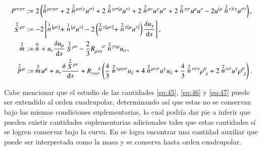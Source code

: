 \begin{align}
I^{\mu \nu \gamma \sigma} &:= 2\left( \des{2}{n}^{\mu \nu \gamma \sigma} + 2 \des{2}{n}^{\mu \nu (\gamma} u^{\sigma)} + 2\des{2}{n}^{\gamma \sigma (\mu} u^{\nu)} + 2\des{2}{n}^{\mu \nu} u^{\gamma} u^{\sigma} + 2\des{2}{n}^{\gamma \sigma} u^{\mu} u^{\nu} - 2 u^{(\mu} \des{2}{n}^{\nu)(\gamma} u^{\sigma)} \right),\\
\des{2}{S}^{\mu \nu} &:= -2 \left[ \des{1}{n}^{[\mu \nu]} + \des{1}{n}^{[\mu} u^{\nu]} - 2\left( \des{2}{n}^{\gamma [\mu \nu]} + \des{2}{n}^{\gamma [\mu} u^{\nu]} \right) \cd{u_{\gamma}} \right],\\
\des{2}{m} &:= \ \des{0}{n} + u_{\nu} \cd{u_{\mu}} \des{2}{S}^{\mu \nu} - \frac{2}{3} R_{\mu \nu \gamma}^{\ \ \ \ \sigma} \des{2}{n}^{\gamma \nu \mu} u_{\sigma},\\
\des{2}{p}^{\mu} &:= \ \des{2}{m} u^{\mu} + u_{\nu} \cd{\des{2}{S}^{\mu \nu}} + R_{\nu \gamma \sigma}^{\ \ \ \ \delta} \left( \frac{4}{3}\des{2}{n}^{\nu \mu \gamma \sigma} u_{\delta} + 4\des{2}{n}^{\mu \nu \sigma} u^{\gamma} u_{\delta} + \frac{4}{3} \des{2}{n}^{\nu \sigma \gamma} \rho^{\mu}_{\ \delta} + 2 \des{2}{n}^{\nu \sigma} u^{\gamma} \rho^{\mu}_{\ \delta} \right).
\end{align}

Cabe mencionar que el estudio de las cantidades \eqref{eq:45}, \eqref{eq:46} y \eqref{eq:47} puede ser extendido al orden cuadrupolar, determinando así que estas no se conservan bajo las mismas condiciones suplementarias, lo cual podría dar pie a inferir que pueden existir cantidades suplementarias adicionales tales que estas cantidades sí se logren conservar bajo la curva. En \cite{Steinhoff-Puetzfeld-2} se logra encontrar una cantidad auxiliar que puede ser interpretada como la masa y se conserva hasta orden cuadrupolar.